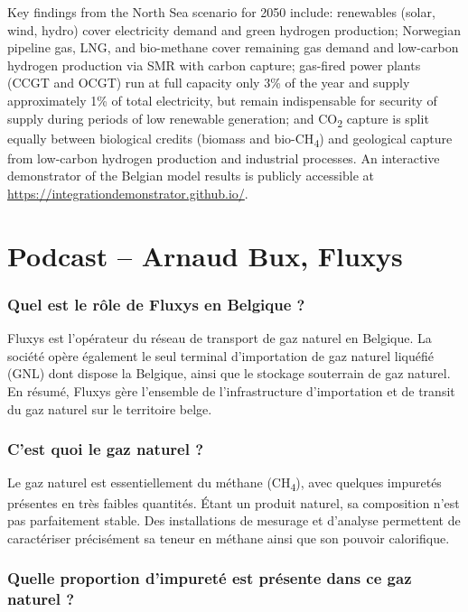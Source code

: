 Key findings from the North Sea scenario for 2050 include: renewables (solar, wind, hydro) cover electricity demand and green hydrogen production; Norwegian pipeline gas, LNG, and bio-methane cover remaining gas demand and low-carbon hydrogen production via SMR with carbon capture; gas-fired power plants (CCGT and OCGT) run at full capacity only 3\% of the year and supply approximately 1\% of total electricity, but remain indispensable for security of supply during periods of low renewable generation; and CO\textsubscript{2} capture is split equally between biological credits (biomass and bio-CH\textsubscript{4}) and geological capture from low-carbon hydrogen production and industrial processes. An interactive demonstrator of the Belgian model results is publicly accessible at \url{https://integrationdemonstrator.github.io/}.



\section{Podcast -- Arnaud Bux, Fluxys}

\subsubsection{Quel est le rôle de Fluxys en Belgique ?}

Fluxys est l'opérateur du réseau de transport de gaz naturel en Belgique. La société opère également le seul terminal d'importation de gaz naturel liquéfié (GNL) dont dispose la Belgique, ainsi que le stockage souterrain de gaz naturel. En résumé, Fluxys gère l'ensemble de l'infrastructure d'importation et de transit du gaz naturel sur le territoire belge.

\subsubsection{C'est quoi le gaz naturel ?}

Le gaz naturel est essentiellement du méthane (CH\textsubscript{4}), avec quelques impuretés présentes en très faibles quantités. Étant un produit naturel, sa composition n'est pas parfaitement stable. Des installations de mesurage et d'analyse permettent de caractériser précisément sa teneur en méthane ainsi que son pouvoir calorifique.

\subsubsection{Quelle proportion d'impureté est présente dans ce gaz naturel ?}

